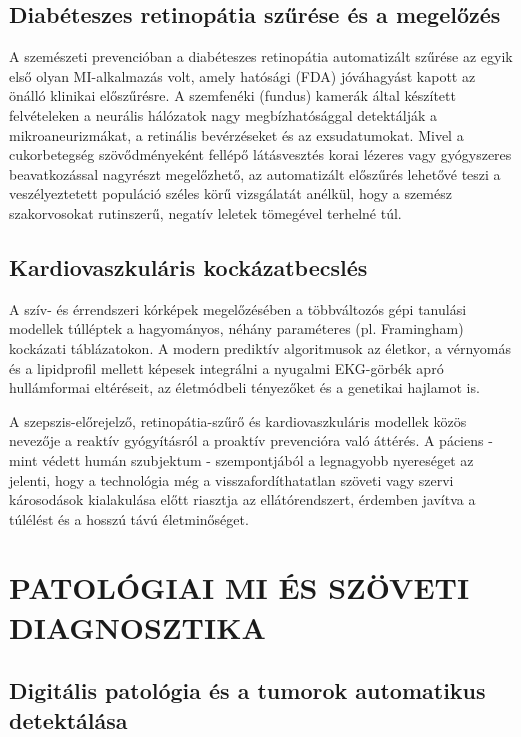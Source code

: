 \documentclass[12pt,a4paper,oneside]{book}
\begin{document}
\subsection{Diabéteszes retinopátia szűrése és a megelőzés}

A szemészeti prevencióban a diabéteszes retinopátia automatizált szűrése az egyik első olyan MI-alkalmazás volt, amely hatósági (FDA) jóváhagyást kapott az önálló klinikai előszűrésre. A szemfenéki (fundus) kamerák által készített felvételeken a neurális hálózatok nagy megbízhatósággal detektálják a mikroaneurizmákat, a retinális bevérzéseket és az exsudatumokat. Mivel a cukorbetegség szövődményeként fellépő látásvesztés korai lézeres vagy gyógyszeres beavatkozással nagyrészt megelőzhető, az automatizált előszűrés lehetővé teszi a veszélyeztetett populáció széles körű vizsgálatát anélkül, hogy a szemész szakorvosokat rutinszerű, negatív leletek tömegével terhelné túl.

\subsection{Kardiovaszkuláris kockázatbecslés}

A szív- és érrendszeri kórképek megelőzésében a többváltozós gépi tanulási modellek túlléptek a hagyományos, néhány paraméteres (pl. Framingham) kockázati táblázatokon. A modern prediktív algoritmusok az életkor, a vérnyomás és a lipidprofil mellett képesek integrálni a nyugalmi EKG-görbék apró hullámformai eltéréseit, az életmódbeli tényezőket és a genetikai hajlamot is. 

A szepszis-előrejelző, retinopátia-szűrő és kardiovaszkuláris modellek közös nevezője a reaktív gyógyításról a proaktív prevencióra való áttérés. A páciens - mint védett humán szubjektum - szempontjából a legnagyobb nyereséget az jelenti, hogy a technológia még a visszafordíthatatlan szöveti vagy szervi károsodások kialakulása előtt riasztja az ellátórendszert, érdemben javítva a túlélést és a hosszú távú életminőséget.

\section{PATOLÓGIAI MI ÉS SZÖVETI DIAGNOSZTIKA}

\subsection{Digitális patológia és a tumorok automatikus detektálása}
\end{document}
